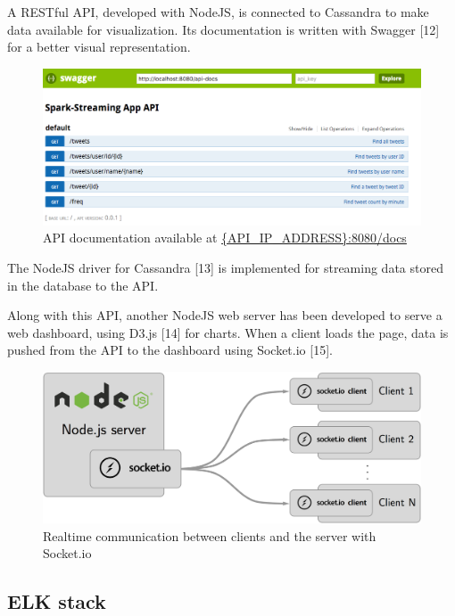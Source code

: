 \documentclass[11pt]{article}
\begin{document}
A RESTful API, developed with \textsf{NodeJS}, is connected to \textsf{Cassandra} to make data available for visualization. 
Its documentation is written with \textsf{Swagger} [12] for a better visual representation.

\begin{figure}[h!]
    \centering
    \includegraphics[scale=0.38]{img/api-docs.png}
    \caption{API documentation available at \url{{API_IP_ADDRESS}:8080/docs}}
    \label{socket}
\end{figure}

The \textsf{NodeJS} driver for \textsf{Cassandra} [13] is implemented for streaming data stored in the database to the API.

Along with this API, another \textsf{NodeJS} web server has been developed to serve a web dashboard, using \textsf{D3.js} [14] for charts. When a client loads the page, data is pushed from the API to the dashboard using \textsf{Socket.io} [15].

\begin{figure}[h!]
    \centering
    \includegraphics[scale=0.11]{img/api-dashboard-socket.png}
    \caption{Realtime communication between clients and the server with \textsf{Socket.io}}
    \label{socket}
\end{figure}

\newpage
\subsection{ELK stack}
\end{document}
